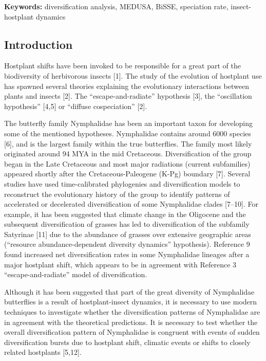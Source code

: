 \documentclass[10pt]{article}
\begin{document}
\textbf{Keywords:} diversification analysis, MEDUSA, BiSSE, speciation
rate, insect-hostplant dynamics

\subsection{Introduction}\label{introduction}

Hostplant shifts have been invoked to be responsible for a great part of
the biodiversity of herbivorous insects {[}1{]}. The study of the
evolution of hostplant use has spawned several theories explaining the
evolutionary interactions between plants and insects {[}2{]}. The
``escape-and-radiate'' hypothesis {[}3{]}, the ``oscillation
hypothesis'' {[}4,5{]} or ``diffuse cospeciation'' {[}2{]}.

The butterfly family Nymphalidae has been an important taxon for
developing some of the mentioned hypotheses. Nymphalidae contains around
6000 species {[}6{]}, and is the largest family within the true
butterflies. The family most likely originated around 94 MYA in the mid
Cretaceous. Diversification of the group began in the Late Cretaceous
and most major radiations (current subfamilies) appeared shortly after
the Cretaceous-Paleogene (K-Pg) boundary {[}7{]}. Several studies have
used time-calibrated phylogenies and diversification models to
reconstruct the evolutionary history of the group to identify patterns
of accelerated or decelerated diversification of some Nymphalidae clades
{[}7--10{]}. For example, it has been suggested that climate change in
the Oligocene and the subsequent diversification of grasses has led to
diversification of the subfamily Satyrinae {[}11{]} due to the abundance
of grasses over extensive geographic areas (``resource
abundance-dependent diversity dynamics'' hypothesis). Reference 9 found
increased net diversification rates in some Nymphalidae lineages after a
major hostplant shift, which appears to be in agreement with Reference 3
``escape-and-radiate'' model of diversification.

Although it has been suggested that part of the great diversity of
Nymphalidae butterflies is a result of hostplant-insect dynamics, it is
necessary to use modern techniques to investigate whether the
diversification patterns of Nymphalidae are in agreement with the
theoretical predictions. It is necessary to test whether the overall
diversification pattern of Nymphalidae is congruent with events of
sudden diversification bursts due to hostplant shift, climatic events or
shifts to closely related hostplants {[}5,12{]}.
\end{document}
